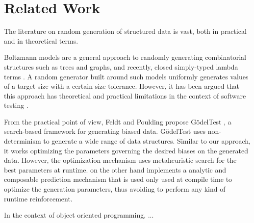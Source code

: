 \section{Related Work}

The literature on random generation of structured data is vast, both in
practical and in theoretical terms.

%
%
Boltzmann models \tocite are a general approach to randomly generating
combinatorial structures such as trees and graphs, and recently, closed
simply-typed lambda terms \tocite.
%
A random generator built around such models uniformly generates values of a
target size with a certain size tolerance.
%
However, it has been argued that this approach has theoretical and practical
limitations in the context of software testing \tocite.

%
%
From the practical point of view, Feldt and Poulding propose G\"odelTest
\tocite, a search-based framework for generating biased data.
%
G\"odelTest uses non-determinism to generate a wide range of data structures.
%
Similar to our approach, it works optimizing the parameters governing the
desired biases on the generated data.
%
However, the optimization mechanism uses metaheuristic search for the best
parameters at runtime.
%
\dragenp on the other hand implements a analytic and composable prediction
mechanism that is used only used at compile time to optimize the generation
parameters, thus avoiding to perform any kind of runtime reinforcement.

%
%
In the context of object oriented programming, ...

